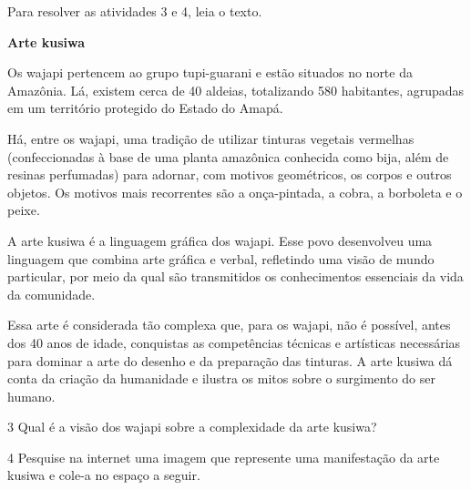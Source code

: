 Para resolver as atividades 3 e 4, leia o texto.

\begin{myquote}
\textbf{Arte kusiwa}

Os wajapi pertencem ao grupo tupi-guarani e estão situados no norte da
Amazônia. Lá, existem cerca de 40 aldeias, totalizando 580 habitantes,
agrupadas em um território protegido do Estado do Amapá.

Há, entre os wajapi, uma tradição de utilizar tinturas vegetais vermelhas
(confeccionadas à base de uma planta amazônica conhecida como bija, além
de resinas perfumadas) para adornar, com motivos geométricos, os corpos e
outros objetos. Os motivos mais recorrentes são a onça-pintada, a cobra, a
borboleta e o peixe.

A arte kusiwa é a linguagem gráfica dos wajapi. Esse povo
desenvolveu uma linguagem que combina arte gráfica e verbal, refletindo uma
visão de mundo particular, por meio da qual são transmitidos os conhecimentos
essenciais da vida da comunidade.

Essa arte é considerada tão complexa que, para os wajapi, não é possível, antes
dos 40 anos de idade, conquistas as competências técnicas e artísticas necessárias
para dominar a arte do desenho e da preparação das tinturas. A arte kusiwa dá conta
da criação da humanidade e ilustra os mitos sobre o surgimento do ser humano.

\end{myquote}


\num{3}  Qual é a visão dos wajapi sobre a complexidade da arte kusiwa?


\pagebreak
\num{4}  Pesquise na internet uma imagem que represente uma manifestação da
arte kusiwa e cole-a no espaço a seguir.

\begin{mdframed}[linewidth=2pt,linecolor=salmao,roundcorner=20pt]
\vspace{19cm}
\end{mdframed}



